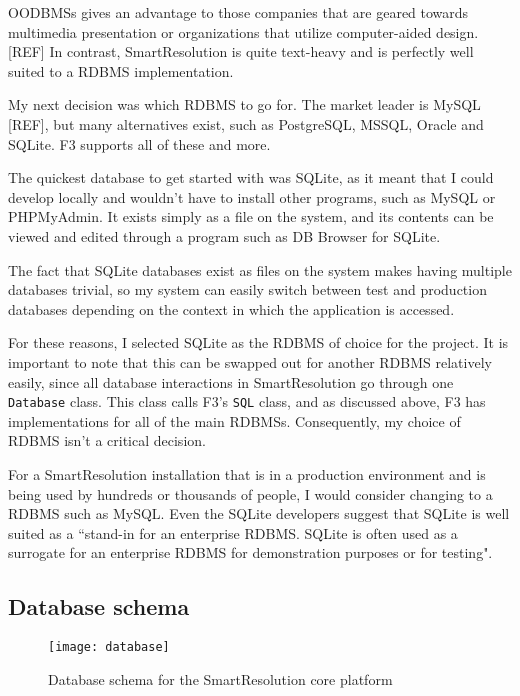 OODBMSs gives an advantage to those companies that are geared towards multimedia presentation or organizations that utilize computer-aided design. [REF] In contrast, SmartResolution is quite text-heavy and is perfectly well suited to a RDBMS implementation.~\cite{oodbms}

My next decision was which RDBMS to go for. The market leader is MySQL [REF], but many alternatives exist, such as PostgreSQL, MSSQL, Oracle and SQLite. F3 supports all of these and more.~\cite{f3:sqlConstructor}

The quickest database to get started with was SQLite, as it meant that I could develop locally and wouldn't have to install other programs, such as MySQL or PHPMyAdmin. It exists simply as a file on the system, and its contents can be viewed and edited through a program such as DB Browser for SQLite.~\cite{sqlitebrowser}

The fact that SQLite databases exist as files on the system makes having multiple databases trivial, so my system can easily switch between test and production databases depending on the context in which the application is accessed.

For these reasons, I selected SQLite as the RDBMS of choice for the project. It is important to note that this can be swapped out for another RDBMS relatively easily, since all database interactions in SmartResolution go through one \lstinline{Database} class. This class calls F3's \lstinline{SQL} class, and as discussed above, F3 has implementations for all of the main RDBMSs. Consequently, my choice of RDBMS isn't a critical decision.

For a SmartResolution installation that is in a production environment and is being used by hundreds or thousands of people, I would consider changing to a RDBMS such as MySQL. Even the SQLite developers suggest that SQLite is well suited as a ``stand-in for an enterprise RDBMS. SQLite is often used as a surrogate for an enterprise RDBMS for demonstration purposes or for testing".~\cite{sqliteFeatures}

\subsection{Database schema}

\begin{figure}[h!]
  \centering
    \ifimages
    \texttt{[image: database]}
    \fi
  \caption{Database schema for the SmartResolution core platform}
  \label{uml:databaseSchema}
\end{figure}

